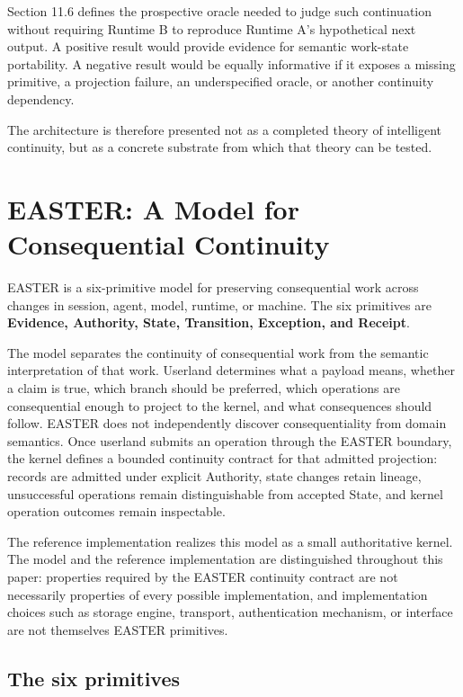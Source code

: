 \documentclass[11pt]{article}
\begin{document}
Section 11.6 defines the prospective oracle needed to judge such continuation without requiring Runtime B to reproduce Runtime A's hypothetical next output. A positive result would provide evidence for semantic work-state portability. A negative result would be equally informative if it exposes a missing primitive, a projection failure, an underspecified oracle, or another continuity dependency.

The architecture is therefore presented not as a completed theory of intelligent continuity, but as a concrete substrate from which that theory can be tested.

\section{EASTER: A Model for Consequential Continuity}

EASTER is a six-primitive model for preserving consequential work across changes in session, agent, model, runtime, or machine. The six primitives are \textbf{Evidence, Authority, State, Transition, Exception, and Receipt}.

The model separates the continuity of consequential work from the semantic interpretation of that work. Userland determines what a payload means, whether a claim is true, which branch should be preferred, which operations are consequential enough to project to the kernel, and what consequences should follow. EASTER does not independently discover consequentiality from domain semantics. Once userland submits an operation through the EASTER boundary, the kernel defines a bounded continuity contract for that admitted projection: records are admitted under explicit Authority, state changes retain lineage, unsuccessful operations remain distinguishable from accepted State, and kernel operation outcomes remain inspectable.

The reference implementation realizes this model as a small authoritative kernel. The model and the reference implementation are distinguished throughout this paper: properties required by the EASTER continuity contract are not necessarily properties of every possible implementation, and implementation choices such as storage engine, transport, authentication mechanism, or interface are not themselves EASTER primitives.

\subsection{The six primitives}
\end{document}
